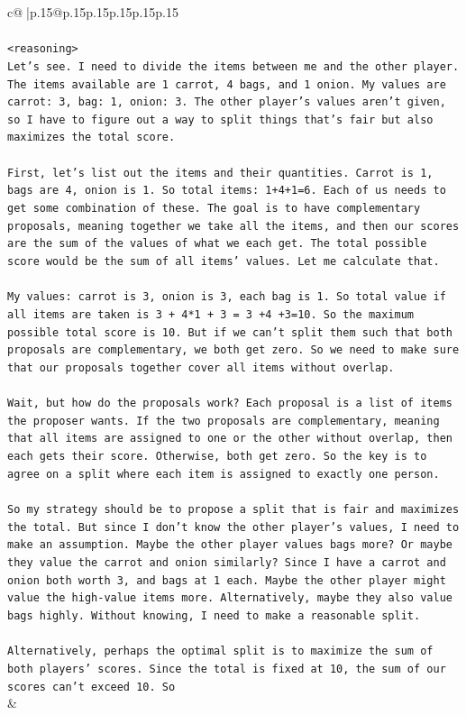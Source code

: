 \documentclass{article}
\begin{document}
{\begin{supertabular}{c@{$\;$}|p{.15\linewidth}@{}p{.15\linewidth}p{.15\linewidth}p{.15\linewidth}p{.15\linewidth}p{.15\linewidth}}
{{{\\ 
\\ 
\texttt{<reasoning>} \\
\texttt{Let's see. I need to divide the items between me and the other player. The items available are 1 carrot, 4 bags, and 1 onion. My values are carrot: 3, bag: 1, onion: 3. The other player's values aren't given, so I have to figure out a way to split things that's fair but also maximizes the total score.} \\
\\ 
\texttt{First, let's list out the items and their quantities. Carrot is 1, bags are 4, onion is 1. So total items: 1+4+1=6. Each of us needs to get some combination of these. The goal is to have complementary proposals, meaning together we take all the items, and then our scores are the sum of the values of what we each get. The total possible score would be the sum of all items' values. Let me calculate that.} \\
\\ 
\texttt{My values: carrot is 3, onion is 3, each bag is 1. So total value if all items are taken is 3 + 4*1 + 3 = 3 +4 +3=10. So the maximum possible total score is 10. But if we can't split them such that both proposals are complementary, we both get zero. So we need to make sure that our proposals together cover all items without overlap.} \\
\\ 
\texttt{Wait, but how do the proposals work? Each proposal is a list of items the proposer wants. If the two proposals are complementary, meaning that all items are assigned to one or the other without overlap, then each gets their score. Otherwise, both get zero. So the key is to agree on a split where each item is assigned to exactly one person.} \\
\\ 
\texttt{So my strategy should be to propose a split that is fair and maximizes the total. But since I don't know the other player's values, I need to make an assumption. Maybe the other player values bags more? Or maybe they value the carrot and onion similarly? Since I have a carrot and onion both worth 3, and bags at 1 each. Maybe the other player might value the high{-}value items more. Alternatively, maybe they also value bags highly. Without knowing, I need to make a reasonable split.} \\
\\ 
\texttt{Alternatively, perhaps the optimal split is to maximize the sum of both players' scores. Since the total is fixed at 10, the sum of our scores can't exceed 10. So} \\
            }
        }
    }
    & \\ \\


\end{supertabular}}
\end{document}
